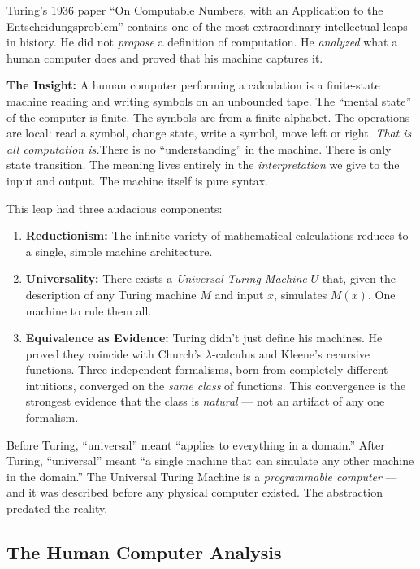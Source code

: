 Turing's 1936 paper ``On Computable Numbers, with an Application to the Entscheidungsproblem'' contains one of the most extraordinary intellectual leaps in history. He did not \emph{propose} a definition of computation. He \emph{analyzed} what a human computer does and proved that his machine captures it.

\textbf{The Insight:} A human computer performing a calculation is a finite-state machine reading and writing symbols on an unbounded tape. The ``mental state'' of the computer is finite. The symbols are from a finite alphabet. The operations are local: read a symbol, change state, write a symbol, move left or right. \emph{That is all computation is.}There is no ``understanding'' in the machine. There is only state transition. The meaning lives entirely in the \emph{interpretation} we give to the input and output. The machine itself is pure syntax.

This leap had three audacious components:

\begin{enumerate}
\item \textbf{Reductionism:} The infinite variety of mathematical calculations reduces to a single, simple machine architecture.

\item \textbf{Universality:} There exists a \emph{Universal Turing Machine} $U$ that, given the description of any Turing machine $M$ and input $x$, simulates $M(x)$. One machine to rule them all.

\item \textbf{Equivalence as Evidence:} Turing didn't just define his machines. He proved they coincide with Church's $\lambda$-calculus and Kleene's recursive functions. Three independent formalisms, born from completely different intuitions, converged on the \emph{same class} of functions. This convergence is the strongest evidence that the class is \emph{natural} --- not an artifact of any one formalism.
\end{enumerate}

Before Turing, ``universal'' meant ``applies to everything in a domain.'' After Turing, ``universal'' meant ``a single machine that can simulate any other machine in the domain.'' The Universal Turing Machine is a \emph{programmable computer} --- and it was described before any physical computer existed. The abstraction predated the reality.

\subsection*{The Human Computer Analysis}

